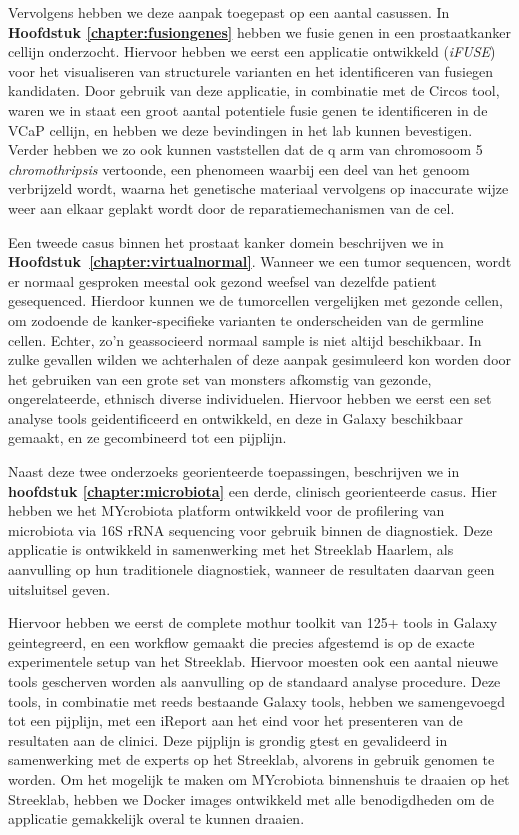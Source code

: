 Vervolgens hebben we deze aanpak toegepast op een aantal casussen. In \textbf{Hoofdstuk \ref{chapter:fusiongenes}} hebben we fusie genen in een prostaatkanker cellijn onderzocht. Hiervoor hebben we eerst een applicatie ontwikkeld (\emph{iFUSE}) voor het visualiseren van structurele varianten en het identificeren van fusiegen kandidaten.
Door gebruik van deze applicatie, in combinatie met de Circos tool, waren we in staat een groot aantal potentiele fusie genen te identificeren in de VCaP cellijn, en hebben we deze bevindingen in het lab kunnen bevestigen.
Verder hebben we zo ook kunnen vaststellen dat de q arm van chromosoom 5 \emph{chromothripsis} vertoonde, een phenomeen waarbij een deel van het genoom verbrijzeld wordt, waarna het genetische materiaal vervolgens op inaccurate wijze weer aan elkaar geplakt wordt door de reparatiemechanismen van de cel.

Een tweede casus binnen het prostaat kanker domein beschrijven we in \textbf{Hoofdstuk~\ref{chapter:virtualnormal}}. Wanneer we een tumor sequencen, wordt er normaal gesproken meestal ook gezond weefsel van dezelfde patient gesequenced.
Hierdoor kunnen we de tumorcellen vergelijken met gezonde cellen, om zodoende de kanker-specifieke varianten te onderscheiden van de germline cellen.
Echter, zo'n geassocieerd normaal sample is niet altijd beschikbaar.
In zulke gevallen wilden we achterhalen of deze aanpak gesimuleerd kon worden door het gebruiken van een grote set van monsters afkomstig van gezonde, ongerelateerde, ethnisch diverse individuelen.
Hiervoor hebben we eerst een set analyse tools geidentificeerd en ontwikkeld, en deze in Galaxy beschikbaar gemaakt, en ze gecombineerd tot een pijplijn.

Naast deze twee onderzoeks georienteerde toepassingen, beschrijven we in \textbf{hoofdstuk \ref{chapter:microbiota}} een derde, clinisch georienteerde casus. Hier hebben we het MYcrobiota platform ontwikkeld voor de profilering van microbiota via 16S rRNA sequencing voor gebruik binnen de diagnostiek.
Deze applicatie is ontwikkeld in samenwerking met het Streeklab Haarlem, als aanvulling op hun traditionele diagnostiek, wanneer de resultaten daarvan geen uitsluitsel geven.

Hiervoor hebben we eerst de complete mothur toolkit van 125+ tools in Galaxy geintegreerd, en een workflow gemaakt die precies afgestemd is op de exacte experimentele setup van het Streeklab.
Hiervoor moesten ook een aantal nieuwe tools gescherven worden als aanvulling op de standaard analyse procedure.
Deze tools, in combinatie met reeds bestaande Galaxy tools, hebben we samengevoegd tot een pijplijn, met een iReport aan het eind voor het presenteren van de resultaten aan de clinici.
Deze pijplijn is grondig gtest en gevalideerd in samenwerking met de experts op het Streeklab, alvorens in gebruik genomen te worden.
Om het mogelijk te maken om MYcrobiota binnenshuis te draaien op het Streeklab, hebben we Docker images ontwikkeld met alle benodigdheden om de applicatie gemakkelijk overal te kunnen draaien.

